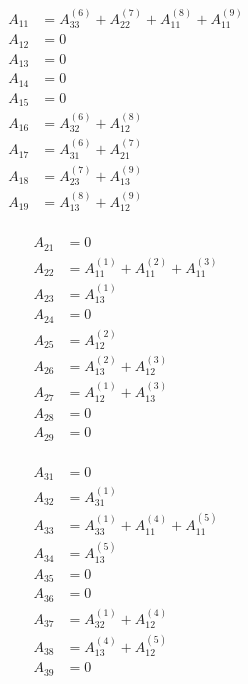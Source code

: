 \documentclass[9pt]{amsart}
\newcommand{\e}[2]{_{#1}^{(#2)}}
\begin{document}
\begin{multicols}{3}
  \begin{align*}
    A_{11}&=A\e{33}{6}+A\e{22}{7}+A\e{11}{8}+A\e{11}{9}\\
    A_{12}&=0\\
    A_{13}&=0\\
    A_{14}&=0\\
    A_{15}&=0\\
    A_{16}&=A\e{32}{6}+A\e{12}{8}\\
    A_{17}&=A\e{31}{6}+A\e{21}{7}\\
    A_{18}&=A\e{23}{7}+A\e{13}{9}\\
    A_{19}&=A\e{13}{8}+A\e{12}{9}\\
  \end{align*}

  \begin{align*}
    A_{21}&=0\\
    A_{22}&=A\e{11}{1}+A\e{11}{2}+A\e{11}{3}\\
    A_{23}&=A\e{13}{1}\\
    A_{24}&=0\\
    A_{25}&=A\e{12}{2}\\
    A_{26}&=A\e{13}{2}+A\e{12}{3}\\
    A_{27}&=A\e{12}{1}+A\e{13}{3}\\
    A_{28}&=0\\
    A_{29}&=0\\
  \end{align*}

  \begin{align*}
    A_{31}&=0\\
    A_{32}&=A\e{31}{1}\\
    A_{33}&=A\e{33}{1}+A\e{11}{4}+A\e{11}{5}\\
    A_{34}&=A\e{13}{5}\\
    A_{35}&=0\\
    A_{36}&=0\\
    A_{37}&=A\e{32}{1}+A\e{12}{4}\\
    A_{38}&=A\e{13}{4}+A\e{12}{5}\\
    A_{39}&=0\\
  \end{align*}
\end{multicols}
\end{document}
